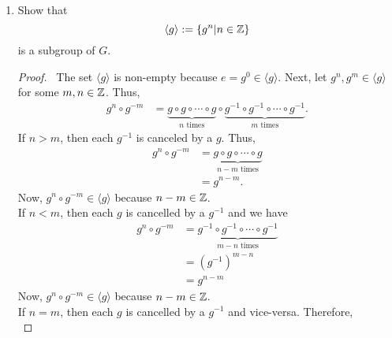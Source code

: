 \documentclass[12pt]{article}
\def\g{\langle g \rangle}
\begin{document}
    \begin{enumerate}[label=\alph*)]
        \item Show that
        \begin{equation*}
            \langle g \rangle := \{g^n | n \in \mathbb{Z}\}
        \end{equation*}
        is a subgroup of \(G\).\\[12pt]
        \begin{proof}
            \ The set \(\langle g \rangle\) is non-empty because \(e = g^0 \in\g\). Next, let \(g^n, g^m\in \g\) for some \(m,n\in \mathbb{Z}\). Thus,
            \begin{equation*}
                \begin{split}
                    g^n \circ g^{-m} &= \underbrace{g\circ g\circ \cdots \circ g}_{n \text{ times}} \circ \underbrace{g^{-1} \circ g^{-1} \circ \cdots \circ g^{-1}}_{m \text{ times}}.
                \end{split}
            \end{equation*}
            If \(n>m\), then each \(g^{-1}\) is canceled by a \(g\). Thus,
            \begin{equation*}
                \begin{split}
                    g^n \circ g^{-m} &= \underbrace{g\circ g\circ \cdots \circ g}_{n-m \text{ times}}\\
                    &= g^{n-m}.
                \end{split}
            \end{equation*}
            Now, \(g^n \circ g^{-m}\in\g\) because \(n-m\in\mathbb{Z}\).\\
            If \(n<m\), then each \(g\) is cancelled by a \(g^{-1}\) and we have
            \begin{equation*}
                \begin{split}
                    g^n \circ g^{-m} &= \underbrace{g^{-1}\circ g^{-1}\circ \cdots \circ g^{-1}}_{m-n \text{ times}}\\
                    &= (g^{-1})^{m-n}\\
                    &= g^{n-m}
                \end{split}                
            \end{equation*}
            Now, \(g^n \circ g^{-m}\in\g\) because \(n-m\in\mathbb{Z}\).\\
            If \(n=m\), then each \(g\) is cancelled by a \(g^{-1}\) and vice-versa. Therefore, 
            \begin{equation*}

\end{equation*}
\end{proof}
\end{enumerate}
\end{document}
